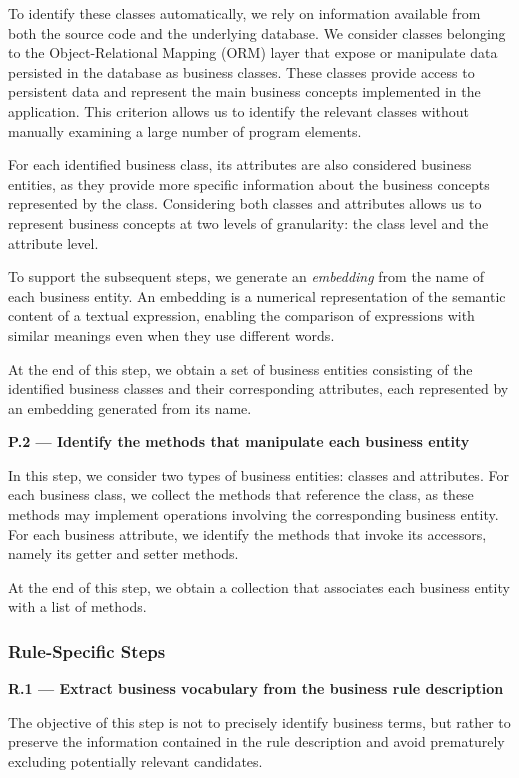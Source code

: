 To identify these classes automatically, we rely on information available from both the source code and the underlying database. We consider classes belonging to the Object-Relational Mapping (ORM) layer that expose or manipulate data persisted in the database as business classes. These classes provide access to persistent data and represent the main business concepts implemented in the application. This criterion allows us to identify the relevant classes without manually examining a large number of program elements.

For each identified business class, its attributes are also considered business entities, as they provide more specific information about the business concepts represented by the class. Considering both classes and attributes allows us to represent business concepts at two levels of granularity: the class level and the attribute level.

To support the subsequent steps, we generate an \textit{embedding} from the name of each business entity. An embedding is a numerical representation of the semantic content of a textual expression, enabling the comparison of expressions with similar meanings even when they use different words.

At the end of this step, we obtain a set of business entities consisting of the identified business classes and their corresponding attributes, each represented by an embedding generated from its name.

\textbf{P.2 — Identify the methods that manipulate each business entity}

In this step, we consider two types of business entities: classes and attributes. For each business class, we collect the methods that reference the class, as these methods may implement operations involving the corresponding business entity. For each business attribute, we identify the methods that invoke its accessors, namely its getter and setter methods.

At the end of this step, we obtain a collection that associates each business entity with a list of methods.

\subsubsection{Rule-Specific Steps}\noindent

\textbf{R.1 — Extract business vocabulary from the business rule description}

The objective of this step is not to precisely identify business terms, but rather to preserve the information contained in the rule description and avoid prematurely excluding potentially relevant candidates.

